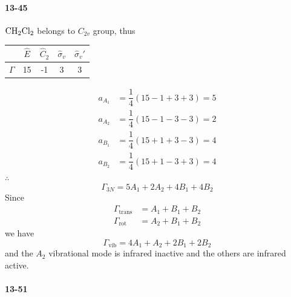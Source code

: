 \documentclass[a4paper]{article}
\newcommand{\ex}[1]{\paragraph{13-#1}}
\numberwithin{equation}{section}
\begin{document}
\ex{45}
$ \ce{CH_2Cl_2} $ belongs to $ C_{2v} $ group, thus
\begin{table}[H]
	\begin{tabular}{c|cccc}
		   & $ \hat{E} $ & $ \hat{C}_2 $ & $ \hat\sigma_v $ & $ \hat\sigma_v' $\\ \hline
		$ \Gamma $ & 15 & -1 & 3 & 3
	\end{tabular}
\end{table}
\begin{align}
a_{A_1} &= \dfrac{1}{4}(15 - 1 + 3 + 3) = 5\\
a_{A_2} &= \dfrac{1}{4}(15 - 1 - 3 - 3) = 2\\
a_{B_1} &= \dfrac{1}{4}(15 + 1 + 3 - 3) = 4\\
a_{B_2} &= \dfrac{1}{4}(15 + 1 - 3 + 3) = 4
\end{align}
$ \therefore $
\begin{equation}\label{key}
\Gamma_{3N} = 5A_1 + 2A_2 + 4B_1 + 4B_2
\end{equation}
Since 
\begin{align}
\Gamma_{\text{trans}} &= A_1 + B_1 + B_2\\
\Gamma_{\text{rot}} &= A_2 + B_1 + B_2 
\end{align}
we have
\begin{equation}\label{key}
\Gamma_{\text{vib}} = 4A_1 + A_2 + 2B_1 + 2B_2
\end{equation}
and the $ A_2 $ vibrational mode is infrared inactive and the others are infrared active.

\ex{51}
\end{document}

